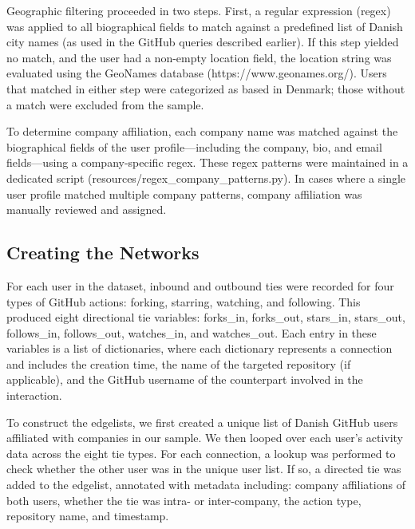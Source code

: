Geographic filtering proceeded in two steps. First, a regular expression (regex) was applied to all biographical fields to match against a predefined list of Danish city names (as used in the GitHub queries described earlier). If this step yielded no match, and the user had a non-empty location field, the location string was evaluated using the GeoNames database (https://www.geonames.org/). Users that matched in either step were categorized as based in Denmark; those without a match were excluded from the sample.

To determine company affiliation, each company name was matched against the biographical fields of the user profile—including the company, bio, and email fields—using a company-specific regex. These regex patterns were maintained in a dedicated script (resources/regex_company_patterns.py). In cases where a single user profile matched multiple company patterns, company affiliation was manually reviewed and assigned.


\subsection{Creating the Networks}

For each user in the dataset, inbound and outbound ties were recorded for four types of GitHub actions: forking, starring, watching, and following. This produced eight directional tie variables: forks_in, forks_out, stars_in, stars_out, follows_in, follows_out, watches_in, and watches_out. Each entry in these variables is a list of dictionaries, where each dictionary represents a connection and includes the creation time, the name of the targeted repository (if applicable), and the GitHub username of the counterpart involved in the interaction.

To construct the edgelists, we first created a unique list of Danish GitHub users affiliated with companies in our sample. We then looped over each user’s activity data across the eight tie types. For each connection, a lookup was performed to check whether the other user was in the unique user list. If so, a directed tie was added to the edgelist, annotated with metadata including: company affiliations of both users, whether the tie was intra- or inter-company, the action type, repository name, and timestamp.


